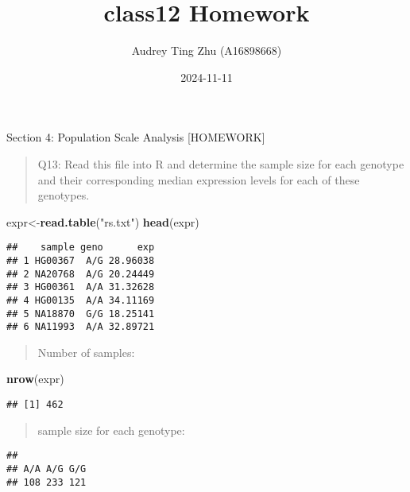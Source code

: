 \documentclass[
]{article}
\title{class12 Homework}
\author{Audrey Ting Zhu (A16898668)}
\date{2024-11-11}
\newenvironment{Shaded}{\begin{snugshade}}{\end{snugshade}}
\newcommand{\FunctionTok}[1]{\textcolor[rgb]{0.13,0.29,0.53}{\textbf{#1}}}
\newcommand{\NormalTok}[1]{#1}
\newcommand{\OtherTok}[1]{\textcolor[rgb]{0.56,0.35,0.01}{#1}}
\newcommand{\SpecialCharTok}[1]{\textcolor[rgb]{0.81,0.36,0.00}{\textbf{#1}}}
\newcommand{\StringTok}[1]{\textcolor[rgb]{0.31,0.60,0.02}{#1}}
\begin{document}
\maketitle

Section 4: Population Scale Analysis {[}HOMEWORK{]}

\begin{quote}
Q13: Read this file into R and determine the sample size for each
genotype and their corresponding median expression levels for each of
these genotypes.
\end{quote}

\begin{Shaded}
\begin{Highlighting}[]
\NormalTok{expr}\OtherTok{\textless{}{-}}\FunctionTok{read.table}\NormalTok{(}\StringTok{"rs.txt"}\NormalTok{)}
\FunctionTok{head}\NormalTok{(expr)}
\end{Highlighting}
\end{Shaded}

\begin{verbatim}
##    sample geno      exp
## 1 HG00367  A/G 28.96038
## 2 NA20768  A/G 20.24449
## 3 HG00361  A/A 31.32628
## 4 HG00135  A/A 34.11169
## 5 NA18870  G/G 18.25141
## 6 NA11993  A/A 32.89721
\end{verbatim}

\begin{quote}
Number of samples:
\end{quote}

\begin{Shaded}
\begin{Highlighting}[]
\FunctionTok{nrow}\NormalTok{(expr)}
\end{Highlighting}
\end{Shaded}

\begin{verbatim}
## [1] 462
\end{verbatim}

\begin{quote}
sample size for each genotype:
\end{quote}

\begin{Shaded}
\end{Shaded}

\begin{verbatim}
## 
## A/A A/G G/G 
## 108 233 121
\end{verbatim}
\end{document}
